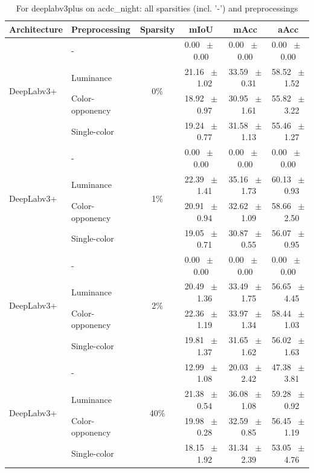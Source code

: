 \begin{table}[h]
  \centering
  \caption{For deeplabv3plus on acdc_night: all sparsities (incl. '-') and preprocessings}
  \begin{tabular}{@{}l l c c c c@{}}
    \toprule
    Architecture & Preprocessing & Sparsity & mIoU & mAcc & aAcc \\
    \midrule
    \multirow{4}{*}{DeepLabv3+} & - & \multirow{4}{*}{0\%} & 0.00 ~$\pm$~ 0.00 & 0.00 ~$\pm$~ 0.00 & 0.00 ~$\pm$~ 0.00 \\
    & Luminance &  & 21.16 ~$\pm$~ 1.02 & 33.59 ~$\pm$~ 0.31 & 58.52 ~$\pm$~ 1.52 \\
    & Color-opponency &  & 18.92 ~$\pm$~ 0.97 & 30.95 ~$\pm$~ 1.61 & 55.82 ~$\pm$~ 3.22 \\
    & Single-color &  & 19.24 ~$\pm$~ 0.77 & 31.58 ~$\pm$~ 1.13 & 55.46 ~$\pm$~ 1.27 \\
    \midrule
    \multirow{4}{*}{DeepLabv3+} & - & \multirow{4}{*}{1\%} & 0.00 ~$\pm$~ 0.00 & 0.00 ~$\pm$~ 0.00 & 0.00 ~$\pm$~ 0.00 \\
    & Luminance &  & 22.39 ~$\pm$~ 1.41 & 35.16 ~$\pm$~ 1.73 & 60.13 ~$\pm$~ 0.93 \\
    & Color-opponency &  & 20.91 ~$\pm$~ 0.94 & 32.62 ~$\pm$~ 1.09 & 58.66 ~$\pm$~ 2.50 \\
    & Single-color &  & 19.05 ~$\pm$~ 0.71 & 30.87 ~$\pm$~ 0.55 & 56.07 ~$\pm$~ 0.95 \\
    \midrule
    \multirow{4}{*}{DeepLabv3+} & - & \multirow{4}{*}{2\%} & 0.00 ~$\pm$~ 0.00 & 0.00 ~$\pm$~ 0.00 & 0.00 ~$\pm$~ 0.00 \\
    & Luminance &  & 20.49 ~$\pm$~ 1.36 & 33.49 ~$\pm$~ 1.75 & 56.65 ~$\pm$~ 4.45 \\
    & Color-opponency &  & 22.36 ~$\pm$~ 1.19 & 33.97 ~$\pm$~ 1.34 & 58.44 ~$\pm$~ 1.03 \\
    & Single-color &  & 19.81 ~$\pm$~ 1.37 & 31.65 ~$\pm$~ 1.62 & 56.02 ~$\pm$~ 1.63 \\
    \midrule
    \multirow{4}{*}{DeepLabv3+} & - & \multirow{4}{*}{40\%} & 12.99 ~$\pm$~ 1.08 & 20.03 ~$\pm$~ 2.42 & 47.38 ~$\pm$~ 3.81 \\
    & Luminance &  & 21.38 ~$\pm$~ 0.54 & 36.08 ~$\pm$~ 1.08 & 59.28 ~$\pm$~ 0.92 \\
    & Color-opponency &  & 19.98 ~$\pm$~ 0.28 & 32.59 ~$\pm$~ 0.85 & 56.45 ~$\pm$~ 1.19 \\
    & Single-color &  & 18.15 ~$\pm$~ 1.92 & 31.34 ~$\pm$~ 2.39 & 53.05 ~$\pm$~ 4.76 \\
    \midrule

\end{tabular}
\end{table}
